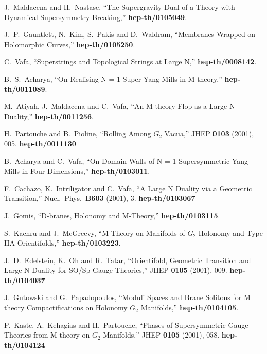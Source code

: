 \documentclass[12pt,a4paper]{article}
\begin{document}
\begin{thebibliography}{99}
 J.~Maldacena and H.~Nastase,
``The Supergravity Dual of a Theory with Dynamical Supersymmetry Breaking,''
{\bf hep-th/0105049}.

 J.~P.~Gauntlett, N.~Kim, S.~Pakis and D.~Waldram,
``Membranes Wrapped on Holomorphic Curves,''
{\bf hep-th/0105250}.

 C.~Vafa, ``Superstrings and Topological Strings at Large N,''
{\bf hep-th/0008142}.

 B.~S.~Acharya, ``On Realising N = 1 Super Yang-Mills in M theory,''
{\bf hep-th/0011089}.

 M.~Atiyah, J.~Maldacena and C.~Vafa,
``An M-theory Flop as a Large N Duality,''
{\bf hep-th/0011256}.

 H.~Partouche and B.~Pioline,
``Rolling Among $G_2$ Vacua,''
JHEP {\bf 0103} (2001), 005. {\bf hep-th/0011130}

 B.~Acharya and C.~Vafa,
``On Domain Walls of N = 1 Supersymmetric Yang-Mills in Four Dimensions,''
{\bf hep-th/0103011}.

 F.~Cachazo, K.~Intriligator and C.~Vafa,
``A Large N Duality via a Geometric Transition,''
Nucl.\ Phys.\  {\bf B603} (2001), 3. {\bf hep-th/0103067}

 J.~Gomis, ``D-branes, Holonomy and M-Theory,''
{\bf hep-th/0103115}.

 S.~Kachru and J.~McGreevy,
``M-Theory on Manifolds of $G_2$ Holonomy and Type IIA Orientifolds,''
{\bf hep-th/0103223}.

 J.~D.~Edelstein, K.~Oh and R.~Tatar,
``Orientifold, Geometric Transition and Large N Duality for SO/Sp Gauge Theories,''
JHEP {\bf 0105} (2001), 009. {\bf hep-th/0104037}

 J.~Gutowski and G.~Papadopoulos,
``Moduli Spaces and Brane Solitons for M theory Compactifications on Holonomy $G_2$ Manifolds,''
{\bf hep-th/0104105}.

 P.~Kaste, A.~Kehagias and H.~Partouche,
``Phases of Supersymmetric Gauge Theories from M-theory on $G_2$ Manifolds,''
JHEP {\bf 0105} (2001), 058. {\bf hep-th/0104124}


\end{thebibliography}
\end{document}
